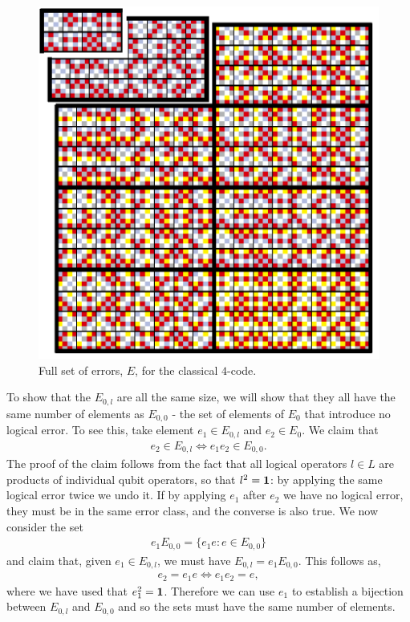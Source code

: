 \begin{figure}[htb]
  \begin{center}
    \includegraphics{figures/4_array.pdf}
  \end{center}
  \caption{Full set of errors, $E$, for the classical $4$-code.}
  \label{4_array}
\end{figure}

To show that the $E_{0, l}$ are all the same size, we will show that they all have the same number of elements as $E_{0,0}$ - the set of elements of $E_0$ that introduce no logical error. To see this, take element $e_1 \in E_{0, l}$ and $e_2 \in E_0$. We claim that
\begin{align}
  e_2 \in E_{0, l} \Leftrightarrow e_1 e_2 \in E_{0,0}.
\end{align}
The proof of the claim follows from the fact that all logical operators $l\in L$ are products of individual qubit operators, so that $l^2 = \mathbf{1}$: by applying the same logical error twice we undo it. If by applying $e_1$ after $e_2$ we have no logical error, they must be in the same error class, and the converse is also true. We now consider the set
\begin{align}
  e_1 E_{0,0} = \{e_1 e : e \in E_{0,0}\}
\end{align}
and claim that, given $e_1 \in E_{0,l}$, we must have $E_{0, l} = e_1 E_{0,0}$. This follows as, 
\begin{align}
  e_2 =  e_1 e \Leftrightarrow e_1 e_2 = e,
\end{align}
where we have used that $e_1^2 = \mathbf{1}$. Therefore we can use $e_1$ to establish a bijection between $E_{0,l}$ and $E_{0,0}$ and so the sets must have the same number of elements.

